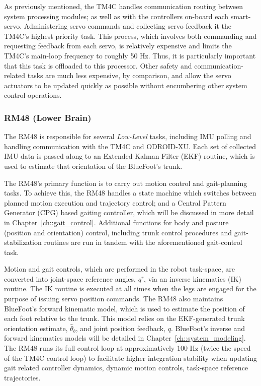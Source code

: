 			As previously mentioned, the TM4C handles communication routing between system processing modules; as well as with the controllers on-board each smart-servo. Administering servo commands and collecting servo feedback it the TM4C's highest priority task. This process, which involves both commanding and requesting feedback from each servo, is relatively expensive  and limits the TM4C's main-loop frequency to roughly 50 Hz. Thus, it is particularly important that this task is offloaded to this processor. Other safety and communication-related tasks are much less expensive, by comparison, and allow the servo actuators to be updated quickly as possible without encumbering other system control operations.


		\subsubsection{RM48 (Lower Brain)}

			The RM48 is responsible for several \emph{Low-Level} tasks, including IMU polling and handling communication with the TM4C and ODROID-XU. Each set of collected IMU data is passed along to an Extended Kalman Filter (EKF) routine, which is used to estimate that orientation of the BlueFoot's trunk.

			The RM48's primary function is to carry out motion control and gait-planning tasks. To achieve this, the RM48 handles a state machine which switches between planned motion execution and trajectory control; and a Central Pattern Generator (CPG) based gaiting controller, which will be discussed in more detail in Chapter~\ref{ch::gait_control}. Additional functions for body and posture (position and orientation) control, including trunk control procedures and gait-stabilization routines are run in tandem with the aforementioned gait-control task.

			Motion and gait controls, which are performed in the robot task-space, are converted into joint-space reference angles, $q^{r}$, via an inverse kinematics (IK) routine. The IK routine is executed at all times when the legs are engaged for the purpose of issuing servo position commands. The RM48 also maintains BlueFoot's forward kinematic model, which is used to estimate the position of each foot relative to the trunk. This model relies on the EKF-generated trunk orientation estimate, $\hat{\theta}_{b}$, and joint position feedback, $q$. BlueFoot's inverse and forward kinematics models will be detailed in Chapter~\ref{ch::system_modeling}. The RM48 runs its full control loop at approximatively 100 Hz (twice the speed of the TM4C control loop) to facilitate higher integration stability when updating gait related controller dynamics, dynamic motion controls, task-space reference trajectories.

